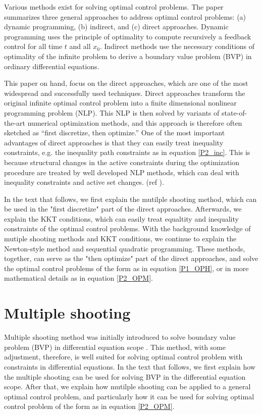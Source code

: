 \documentclass  [
  paper    = a4,
  BCOR     = 10mm,
  twoside,
  fontsize = 12pt,
  fleqn,
  toc      = bibnumbered,
  toc      = listofnumbered,
  numbers  = noendperiod,
  headings = normal,
  listof   = leveldown,
  version  = 3.03
]                                       {scrreprt}
\newcommand{\<}{\langle}
\renewcommand{\>}{\rangle}
\begin{document}
Various methods exist for solving optimal control problems. The paper \cite{MHHP05} summarizes three general approaches to address optimal control problems: (a) dynamic programming, (b) indirect, and (c) direct approaches. Dynamic programming uses the principle of optimality to compute recursively a feedback control for all time $t$ and all $x_0$.  Indirect methods use the necessary conditions of optimality of the infinite problem to derive a boundary value problem (BVP) in ordinary differential equations. 

This paper on hand, focus on the direct approaches, which are one of the most widespread and successfully used techniques. Direct approaches transform the original infinite optimal control problem into a finite dimensional nonlinear programming problem (NLP). This NLP is then solved by variants of state-of-the-art numerical optimization methods, and this approach is therefore often sketched as “first discretize, then optimize.” One of the most important advantages of direct approaches is that they can easily treat inequality constraints, e.g. the inequality path constraints as in equation \ref{P2_inc}. This is because structural changes in the active constraints during the optimization procedure are treated by well developed NLP methods,  which can deal with inequality constraints and active set changes. (ref \cite{MHHP05}).

In the text that follows, we first explain the mutilple shooting method, which can be used in the "first discretize" part of the direct approaches. Afterwards, we explain the KKT conditions, which can easily treat equaltity and inequality constraints of the optimal control problems. With the background knowledge of mutiple shooting methods and KKT conditions, we continue to explain the Newton-style method and sequential quadratic programming. These methods, together, can serve as the "then optimize" part of the  direct approaches, and solve the optimal control problems of the form as in equation \ref{P1_OPH}, or in more mathematical details as in equation \ref{P2_OPM}.


\section{Multiple shooting}
Multiple shooting method was initially introduced to solve boundary value problem (BVP) in differential equation scope \cite{DJJ62}. This method, with some adjustment, therefore, is well suited for solving optimal control problem with constraints in differential equations. In the text that follows, we first explain how the multiple shooting can be used for solving BVP in the differential equation scope. After that, we explain how mutilple shooting can be applied to a general optimal control problem, and particularly how it can be used for solving optimal control problem of the form as in equation \ref{P2_OPM}.
\end{document}
